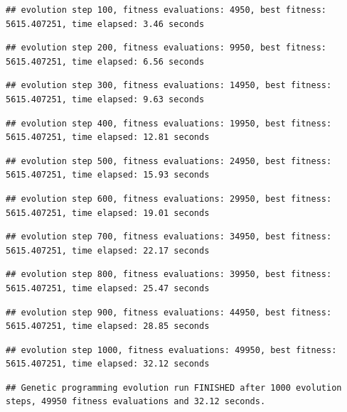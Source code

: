 \documentclass[]{book}
\begin{document}
\begin{verbatim}
## evolution step 100, fitness evaluations: 4950, best fitness: 5615.407251, time elapsed: 3.46 seconds
\end{verbatim}

\begin{verbatim}
## evolution step 200, fitness evaluations: 9950, best fitness: 5615.407251, time elapsed: 6.56 seconds
\end{verbatim}

\begin{verbatim}
## evolution step 300, fitness evaluations: 14950, best fitness: 5615.407251, time elapsed: 9.63 seconds
\end{verbatim}

\begin{verbatim}
## evolution step 400, fitness evaluations: 19950, best fitness: 5615.407251, time elapsed: 12.81 seconds
\end{verbatim}

\begin{verbatim}
## evolution step 500, fitness evaluations: 24950, best fitness: 5615.407251, time elapsed: 15.93 seconds
\end{verbatim}

\begin{verbatim}
## evolution step 600, fitness evaluations: 29950, best fitness: 5615.407251, time elapsed: 19.01 seconds
\end{verbatim}

\begin{verbatim}
## evolution step 700, fitness evaluations: 34950, best fitness: 5615.407251, time elapsed: 22.17 seconds
\end{verbatim}

\begin{verbatim}
## evolution step 800, fitness evaluations: 39950, best fitness: 5615.407251, time elapsed: 25.47 seconds
\end{verbatim}

\begin{verbatim}
## evolution step 900, fitness evaluations: 44950, best fitness: 5615.407251, time elapsed: 28.85 seconds
\end{verbatim}

\begin{verbatim}
## evolution step 1000, fitness evaluations: 49950, best fitness: 5615.407251, time elapsed: 32.12 seconds
\end{verbatim}

\begin{verbatim}
## Genetic programming evolution run FINISHED after 1000 evolution steps, 49950 fitness evaluations and 32.12 seconds.
\end{verbatim}
\end{document}
